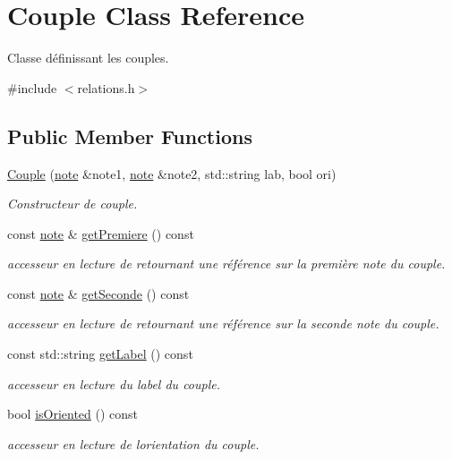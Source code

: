 \hypertarget{class_couple}{}\section{Couple Class Reference}
\label{class_couple}


Classe définissant les couples.  




{\ttfamily \#include $<$relations.\+h$>$}

\subsection*{Public Member Functions}
\begin{DoxyCompactItemize}
\item 
\hyperlink{class_couple_aa1f1400e92e062c0ecdd6f81fdc47d07}{Couple} (\hyperlink{classnote}{note} \&note1, \hyperlink{classnote}{note} \&note2, std\+::string lab, bool ori)
\begin{DoxyCompactList}\small\item\em Constructeur de couple. \end{DoxyCompactList}\item 
\mbox{\label{class_couple_a25c14d126cb78805740000253b32f6d7}} 
const \hyperlink{classnote}{note} \& \hyperlink{class_couple_a25c14d126cb78805740000253b32f6d7}{get\+Premiere} () const
\begin{DoxyCompactList}\small\item\em accesseur en lecture de retournant une référence sur la première note du couple. \end{DoxyCompactList}\item 
\mbox{\label{class_couple_a837894fc5a70507b67c5c3f19da7b9da}} 
const \hyperlink{classnote}{note} \& \hyperlink{class_couple_a837894fc5a70507b67c5c3f19da7b9da}{get\+Seconde} () const
\begin{DoxyCompactList}\small\item\em accesseur en lecture de retournant une référence sur la seconde note du couple. \end{DoxyCompactList}\item 
\mbox{\label{class_couple_acf2f8ba4907cf728a5d8110ac2abdff3}} 
const std\+::string \hyperlink{class_couple_acf2f8ba4907cf728a5d8110ac2abdff3}{get\+Label} () const
\begin{DoxyCompactList}\small\item\em accesseur en lecture du label du couple. \end{DoxyCompactList}\item 
\mbox{\label{class_couple_aa105334f2fa5185c963b54c265720f2e}} 
bool \hyperlink{class_couple_aa105334f2fa5185c963b54c265720f2e}{is\+Oriented} () const
\begin{DoxyCompactList}\small\item\em accesseur en lecture de l\textquotesingle{}orientation du couple. \end{DoxyCompactList}\end{DoxyCompactItemize}


